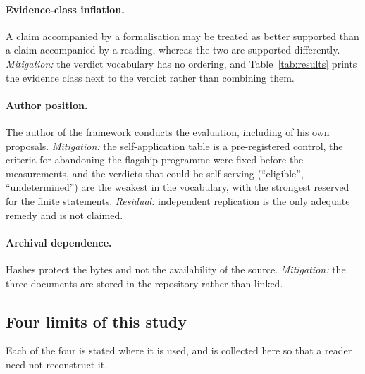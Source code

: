 \documentclass[11pt,a4paper]{article}
\begin{document}
\paragraph{Evidence-class inflation.} A claim accompanied by a formalisation may be treated
as better supported than a claim accompanied by a reading, whereas the two are supported
differently. \emph{Mitigation:} the verdict vocabulary has no ordering, and
Table~\ref{tab:results} prints the evidence class next to the verdict rather than combining
them.

\paragraph{Author position.} The author of the framework conducts the evaluation,
including of his own proposals. \emph{Mitigation:} the self-application table is a pre-registered
control, the criteria for abandoning the flagship programme were fixed before the measurements, and
the verdicts that could be self-serving (``eligible'', ``undetermined'') are the weakest in the
vocabulary, with the strongest reserved for the finite statements. \emph{Residual:} independent
replication is the only adequate remedy and is not claimed.

\paragraph{Archival dependence.} Hashes protect the bytes and not the availability of the
source. \emph{Mitigation:} the three documents are stored in the repository rather than linked.

\subsection{Four limits of this study}

Each of the four is stated where it is used, and is collected here so that a reader need not
reconstruct it.
\end{document}
